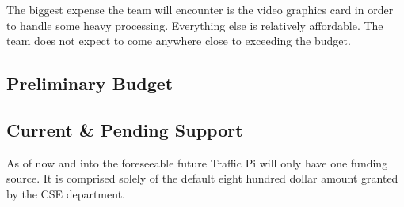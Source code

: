 The biggest expense the team will encounter is the video graphics card in order to handle some heavy processing. Everything else is relatively affordable. The team does not expect to come anywhere close to exceeding the budget.

\subsection{Preliminary Budget}

\begin{table}[h]
\centering
{}
\caption{High level budget table} 
\end{table}

\subsection{Current \& Pending Support}
As of now and into the foreseeable future Traffic Pi will only have one funding source. It is comprised solely of the default eight hundred dollar amount granted by the CSE department.